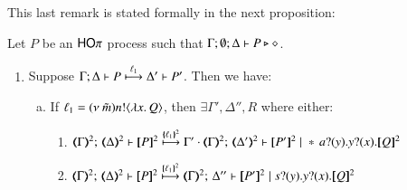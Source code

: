 This last remark is stated formally in the next proposition:
%
\begin{proposition}\myrm
	\label{prop:op_corr_HOp_to_p}
	Let $P$ be an  $\mathsf{HO}\pi$ process such that  $\Gamma; \emptyset; \Delta \vdash P \triangleright \diamond$.
	
	\begin{enumerate}[1.]
		\item Suppose $\Gamma; \Delta \vdash P \stackrel{\ell_1}{\longmapsto} \Delta' \vdash P'$.
		Then we have:
		\begin{enumerate}[a)]
			\item
				If  $\ell_1 = (\nu\ \tilde{m})n ! \langle \lambda x.\,Q \rangle$,
				then $\exists \Gamma', \Delta'', R$ where either:
				\begin{enumerate}[-]
					\item 
						$\tmap{\Gamma}{2};\, \tmap{\Delta}{2} \proves  \pmap{P}{2} 
						\hby{\mapa{\ell_1}^{2}}
						\Gamma' \cdot \tmap{\Gamma}{2};\, \tmap{\Delta'}{2} \proves \pmap{P'}{2} \Par \repl{} \binp{a}{y} \binp{y}{x} \pmap{Q}{2}$
					\item 
						$\tmap{\Gamma}{2};\, \tmap{\Delta}{2} \proves \pmap{P}{2} 
						\hby{\mapa{\ell_1}^{2}}
						\tmap{\Gamma}{2};\, \Delta'' \proves \pmap{P'}{2} \Par \binp{s}{y} \binp{y}{x} \pmap{Q}{2}$
				\end{enumerate}



\end{enumerate}
\end{enumerate}
\end{proposition}
